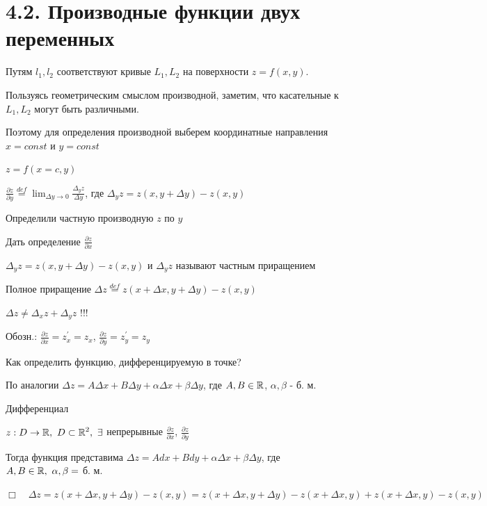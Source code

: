 \documentclass[12pt]{article}
\begin{document}
    \section{4.2. Производные функции двух переменных}

    Путям $l_1, l_2$ соответствуют кривые $L_1, L_2$ на поверхности $z = f(x, y)$.

    Пользуясь геометрическим смыслом производной, заметим, что касательные к $L_1, L_2$ могут быть различными.


    Поэтому для определения производной выберем координатные направления $x = const$ и $y = const$

    $z = f(x = c, y)$

    $\displaystyle \frac{\partial z}{\partial y} \stackrel{def}{=} \lim_{\Delta y \to 0} \frac{\Delta_y z}{\Delta y}$,
    где $\Delta_y z = z(x, y + \Delta y) - z(x, y)$

    Определили частную производную $z$ по $y$

    \Lab Дать определение $\displaystyle \frac{\partial z}{\partial x}$

    \Nota $\Delta_y z = z(x, y + \Delta y) - z(x, y)$ и  $\Delta_y z$ называют частным приращением

    \Def Полное приращение $\Delta z \stackrel{def}{=} z(x + \Delta x, y + \Delta y) - z(x, y)$

    \Nota $\Delta z \neq \Delta_x z + \Delta_y z$ !!!

    Обозн.: $\displaystyle \frac{\partial z}{\partial x} = z^\prime_x = z_x$, $\displaystyle \frac{\partial z}{\partial y} = z^\prime_y = z_y$

    Как определить функцию, дифференцируемую в точке?

    По аналогии $\Delta z = A \Delta x + B \Delta y + \alpha \Delta x + \beta \Delta y$, где $A, B \in \mathbb{R}$, $\alpha, \beta$ - б. м.



    Дифференциал

    \Th $\displaystyle z : D \rightarrow \mathbb{R}, \ D \subset \mathbb{R}^2, \ \exists$
    непрерывные $\displaystyle \frac{\partial z}{\partial x}$, $\displaystyle \frac{\partial z}{\partial y}$

    Тогда функция представима $\displaystyle \Delta z = A dx + B dy + \alpha \Delta x + \beta \Delta y$, где $\displaystyle A, B \in \mathbb{R}, \ \alpha, \beta = $ б. м.

    $\displaystyle \Box \quad \Delta z = z (x + \Delta x, y + \Delta y) - z (x, y) = z(x + \Delta x, y + \Delta y) - z(x + \Delta x, y) +
    z(x + \Delta x, y) - z(x, y)$
\end{document}
